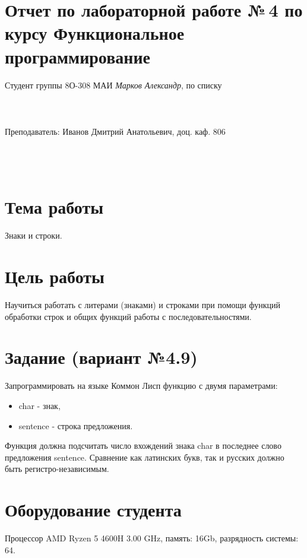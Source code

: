 \documentclass[12pt]{article}
\begin{document}
\section*{Отчет по лабораторной работе №\,4 
по курсу \guillemotleft  Функциональное программирование\guillemotright}
\begin{flushright}
Студент группы 8О-308 МАИ \textit{Марков Александр},  по списку \\
 \\
 \\
\ \\
Преподаватель: Иванов Дмитрий Анатольевич, доц. каф. 806 \\
 \\
 \\
 \\

\end{flushright}

\section{Тема работы}
Знаки и строки.

\section{Цель работы}
Научиться работать с литерами (знаками) и строками при помощи функций обработки строк и общих функций работы с последовательностями.

\section{Задание (вариант №4.9)}
Запрограммировать на языке Коммон Лисп функцию с двумя параметрами:

\begin{itemize}
    \item char - знак,
    \item sentence - строка предложения.
\end{itemize}

Функция должна подсчитать число вхождений знака char в последнее слово предложения sentence. Сравнение как латинских букв, так и русских должно быть регистро-независимым.

\section{Оборудование студента}
Процессор AMD Ryzen 5 4600H 3.00 GHz, память: 16Gb, разрядность системы: 64.
\end{document}
